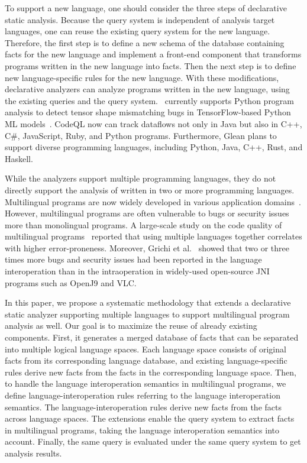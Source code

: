 To support a new language, one should consider
the three steps of declarative static analysis. Because the query
system is independent of analysis target languages, one can reuse the
existing query system for the new language. Therefore, the first step
is to define a new schema of the database containing facts for the new
language and implement a
front-end component that transforms programs written in the new language into facts.
Then the next step is to define new language-specific rules for the new language.  With these
modifications, declarative analyzers can analyze programs written in the new
language, using the existing queries and the query system.  \doop~currently
supports Python program analysis to detect tensor shape mismatching bugs in
TensorFlow-based Python ML models~\cite{lagouvardos2020static}. 
CodeQL now can track dataflows not only in Java but also in C++, C\#,
JavaScript, Ruby, and Python programs.  Furthermore, Glean plans to support
diverse programming languages, including Python, Java, C++, Rust, and Haskell.

While the analyzers support multiple programming languages, they do not
directly support the analysis of  written in two
or more programming languages. 
Multilingual programs are now widely developed in various application
domains~\cite{kochhar2016large, mergendahlcross}. However, multilingual
programs are often vulnerable to bugs or security issues more than monolingual
programs. A large-scale study on the code quality of multilingual
programs~\cite{kochhar2016large} reported that using multiple languages
together correlates with higher error-proneness. Moreover, Grichi et
al.~\cite{grichi2020impact} showed that two or three times more bugs and
security issues had been reported in the language interoperation than in the
intraoperation in widely-used open-source JNI programs such as OpenJ9 and VLC.

In this paper, we propose a systematic methodology that extends a
declarative static analyzer supporting multiple languages to support
multilingual program analysis as well. Our goal is to maximize the reuse of
already existing components. First, it generates a merged database of facts that can
be separated into multiple logical language spaces.  Each language space
consists of original facts from its corresponding language database, and existing
language-specific rules derive new facts from the facts in the corresponding
language space. Then, to handle the language interoperation semantics in
multilingual programs, we define language-interoperation rules referring to
the language interoperation semantics. The language-interoperation rules derive new
facts from the facts across language spaces. The extensions enable the query system
to extract facts in multilingual programs, taking the language
interoperation semantics into account.
Finally, the same query is evaluated under the same query system to get
analysis results.

